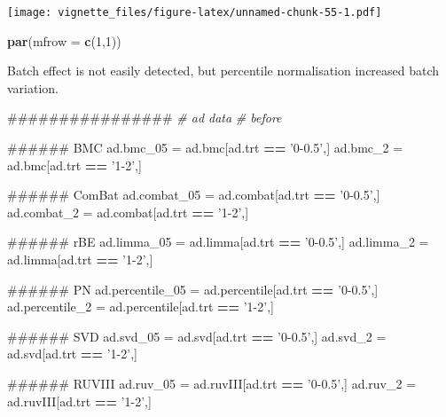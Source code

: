 \documentclass[]{book}
\newenvironment{Shaded}{\begin{snugshade}}{\end{snugshade}}
\newcommand{\KeywordTok}[1]{\textcolor[rgb]{0.13,0.29,0.53}{\textbf{#1}}}
\newcommand{\DataTypeTok}[1]{\textcolor[rgb]{0.13,0.29,0.53}{#1}}
\newcommand{\DecValTok}[1]{\textcolor[rgb]{0.00,0.00,0.81}{#1}}
\newcommand{\StringTok}[1]{\textcolor[rgb]{0.31,0.60,0.02}{#1}}
\newcommand{\CommentTok}[1]{\textcolor[rgb]{0.56,0.35,0.01}{\textit{#1}}}
\newcommand{\OperatorTok}[1]{\textcolor[rgb]{0.81,0.36,0.00}{\textbf{#1}}}
\newcommand{\NormalTok}[1]{#1}
\begin{document}
\texttt{[image: vignette\_files/figure-latex/unnamed-chunk-55-1.pdf]}

\begin{Shaded}
\begin{Highlighting}[]
\KeywordTok{par}\NormalTok{(}\DataTypeTok{mfrow =} \KeywordTok{c}\NormalTok{(}\DecValTok{1}\NormalTok{,}\DecValTok{1}\NormalTok{))}
\end{Highlighting}
\end{Shaded}

Batch effect is not easily detected, but percentile normalisation
increased batch variation.

\begin{Shaded}
\begin{Highlighting}[]
\NormalTok{################}
\CommentTok{# ad data}
\CommentTok{# before}

\NormalTok{###### BMC}
\NormalTok{ad.bmc_}\DecValTok{05}\NormalTok{ =}\StringTok{ }\NormalTok{ad.bmc[ad.trt }\OperatorTok{==}\StringTok{ '0-0.5'}\NormalTok{,]}
\NormalTok{ad.bmc_}\DecValTok{2}\NormalTok{ =}\StringTok{ }\NormalTok{ad.bmc[ad.trt }\OperatorTok{==}\StringTok{ '1-2'}\NormalTok{,]}

\NormalTok{###### ComBat}
\NormalTok{ad.combat_}\DecValTok{05}\NormalTok{ =}\StringTok{ }\NormalTok{ad.combat[ad.trt }\OperatorTok{==}\StringTok{ '0-0.5'}\NormalTok{,]}
\NormalTok{ad.combat_}\DecValTok{2}\NormalTok{ =}\StringTok{ }\NormalTok{ad.combat[ad.trt }\OperatorTok{==}\StringTok{ '1-2'}\NormalTok{,]}

\NormalTok{###### rBE}
\NormalTok{ad.limma_}\DecValTok{05}\NormalTok{ =}\StringTok{ }\NormalTok{ad.limma[ad.trt }\OperatorTok{==}\StringTok{ '0-0.5'}\NormalTok{,]}
\NormalTok{ad.limma_}\DecValTok{2}\NormalTok{ =}\StringTok{ }\NormalTok{ad.limma[ad.trt }\OperatorTok{==}\StringTok{ '1-2'}\NormalTok{,]}

\NormalTok{###### PN}
\NormalTok{ad.percentile_}\DecValTok{05}\NormalTok{ =}\StringTok{ }\NormalTok{ad.percentile[ad.trt }\OperatorTok{==}\StringTok{ '0-0.5'}\NormalTok{,]}
\NormalTok{ad.percentile_}\DecValTok{2}\NormalTok{ =}\StringTok{ }\NormalTok{ad.percentile[ad.trt }\OperatorTok{==}\StringTok{ '1-2'}\NormalTok{,]}

\NormalTok{###### SVD}
\NormalTok{ad.svd_}\DecValTok{05}\NormalTok{ =}\StringTok{ }\NormalTok{ad.svd[ad.trt }\OperatorTok{==}\StringTok{ '0-0.5'}\NormalTok{,]}
\NormalTok{ad.svd_}\DecValTok{2}\NormalTok{ =}\StringTok{ }\NormalTok{ad.svd[ad.trt }\OperatorTok{==}\StringTok{ '1-2'}\NormalTok{,]}

\NormalTok{###### RUVIII}
\NormalTok{ad.ruv_}\DecValTok{05}\NormalTok{ =}\StringTok{ }\NormalTok{ad.ruvIII[ad.trt }\OperatorTok{==}\StringTok{ '0-0.5'}\NormalTok{,]}
\NormalTok{ad.ruv_}\DecValTok{2}\NormalTok{ =}\StringTok{ }\NormalTok{ad.ruvIII[ad.trt }\OperatorTok{==}\StringTok{ '1-2'}\NormalTok{,]}
\end{Highlighting}
\end{Shaded}
\end{document}
